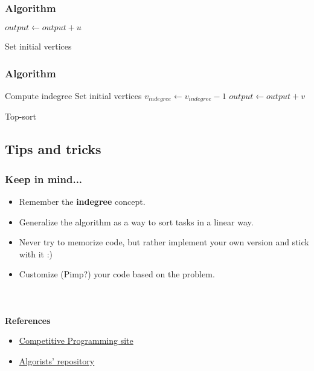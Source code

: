 \documentclass[article]{beamer}
\begin{document}
\begin{frame}
	\frametitle{Algorithm}
	
		\begin{algorithm}[H]
		\begin{algorithmic}[1]			
		\STATE $output \gets output + u$
		\ENDIF
		\ENDFOR
		
		\end{algorithmic}
		\caption{Set initial vertices}
		\label{alg:seq}
		\end{algorithm}	
	
\end{frame}

\begin{frame}
	\frametitle{Algorithm}
	
		\begin{algorithm}[H]
		\begin{algorithmic}[1]
		\STATE Compute indegree
		\STATE Set initial vertices			
		\STATE $v_{indegree} \gets v_{indegree} - 1$
		\STATE $output \gets output + v$
		\ENDIF
		\ENDIF
		\ENDFOR
		\ENDFOR
		
		\end{algorithmic}
		\caption{Top-sort}
		\label{alg:seq}
		\end{algorithm}	
	
\end{frame}


\subsection{Tips and tricks}
\begin{frame}
	\frametitle{Keep in mind...}
	\begin{itemize}
		\item Remember the \textbf{indegree} concept.
		\item Generalize the algorithm as a way to sort tasks in a linear way.
		\item Never try to memorize code, but rather implement your own version and stick with it :)
		\item Customize (Pimp?) your code based on the problem.
	\end{itemize}
\end{frame}

\begin{frame}[plain]
\frametitle{}
\begin{center}
\Huge{\color{blue}{Q \& A}} \\
\vspace{5mm}
\end{center}
\end{frame}

\begin{frame}[plain]
	\textbf{References}
	\begin{itemize}
		\item \href{https://sites.google.com/site/stevenhalim/}{Competitive Programming site}
		\item \href{https://github.com/davidjacobo/algorists/}{Algorists' repository}
	\end{itemize}
\end{frame}
\end{document}
